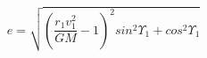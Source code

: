 \begin{equation*}
e = \sqrt{\left(\frac{r_{1}v_{1}^{2}}{GM} - 1\right)^{2}sin^{2}\Upsilon_{1} + cos^{2}\Upsilon_{1}} \tag{4.27}
\end{equation*}
